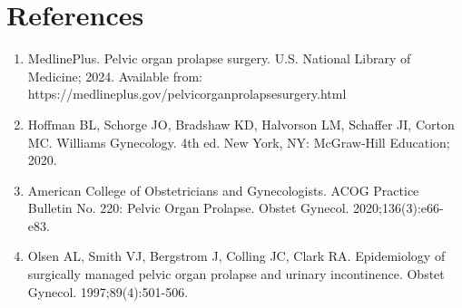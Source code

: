 \section*{References}
\begin{enumerate}
  \item MedlinePlus. Pelvic organ prolapse surgery. U.S. National Library of Medicine; 2024. Available from: https://medlineplus.gov/pelvicorganprolapsesurgery.html
  
  \item Hoffman BL, Schorge JO, Bradshaw KD, Halvorson LM, Schaffer JI, Corton MC. Williams Gynecology. 4th ed. New York, NY: McGraw-Hill Education; 2020.
  
  \item American College of Obstetricians and Gynecologists. ACOG Practice Bulletin No. 220: Pelvic Organ Prolapse. Obstet Gynecol. 2020;136(3):e66-e83.
  
  \item Olsen AL, Smith VJ, Bergstrom J, Colling JC, Clark RA. Epidemiology of surgically managed pelvic organ prolapse and urinary incontinence. Obstet Gynecol. 1997;89(4):501-506.
\end{enumerate}

\clearpage
